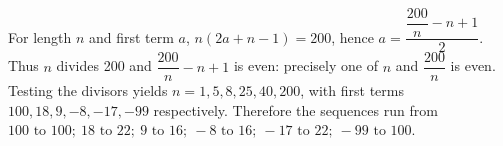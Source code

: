 For length $n$ and first term $a$, $n(2a+n-1)=200$, hence $a=\dfrac{\dfrac{200}{n}-n+1}{2}$. Thus $n$ divides 200 and $\dfrac{200}{n}-n+1$ is even: precisely one of $n$ and $\dfrac{200}{n}$ is even. Testing the divisors yields $n=1,5,8,25,40,200$, with first terms $100,18,9,-8,-17,-99$ respectively. Therefore the sequences run from $\boxed{100\text{ to }100;\ 18\text{ to }22;\ 9\text{ to }16;\ -8\text{ to }16;\ -17\text{ to }22;\ -99\text{ to }100}$.
